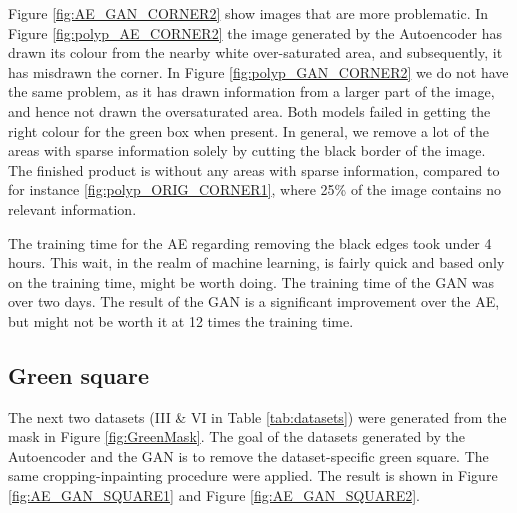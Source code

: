 Figure \ref{fig:AE_GAN_CORNER2} show images that are more problematic. In Figure \ref{fig:polyp_AE_CORNER2} the image generated by the Autoencoder has drawn its colour from the nearby white over-saturated area, and subsequently, it has misdrawn the corner. In Figure \ref{fig:polyp_GAN_CORNER2} we do not have the same problem, as it has drawn information from a larger part of the image, and hence not drawn the oversaturated area.
Both models failed in getting the right colour for the green box when present. 
In general, we remove a lot of the areas with sparse information solely by cutting the black border of the image. The finished product is without any areas with sparse information, compared to for instance \ref{fig:polyp_ORIG_CORNER1}, where 25\% of the image contains no relevant information. 

\vspace{5px}
\noindent The training time for the AE regarding removing the black edges took under 4 hours. This wait, in the realm of machine learning, is fairly quick and based only on the training time, might be worth doing.
The training time of the GAN was over two days. The result of the GAN is a significant improvement over the AE, but might not be worth it at 12 times the training time. 


\FloatBarrier
\subsection{Green square}
The next two datasets (III \& VI in Table \ref{tab:datasets}) were generated from the mask in Figure \ref{fig:GreenMask}.  The goal of the datasets generated by the Autoencoder and the GAN is to remove the dataset-specific green square. The same cropping-inpainting procedure were applied. The result is shown in Figure \ref{fig:AE_GAN_SQUARE1} and Figure \ref{fig:AE_GAN_SQUARE2}.


